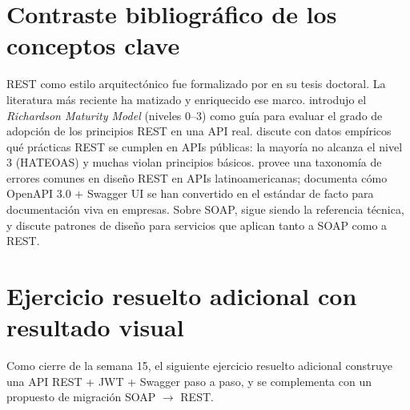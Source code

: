 \documentclass[11pt,a4paper,openany]{book}
\begin{document}
\section{Contraste bibliográfico de los conceptos clave}

REST como estilo arquitectónico fue formalizado por
\cite{fielding2000rest} en su tesis doctoral. La literatura más
reciente ha matizado y enriquecido ese marco. \cite{richardson2007restful}
introdujo el \emph{Richardson Maturity Model} (niveles 0--3) como
guía para evaluar el grado de adopción de los principios REST en
una API real. \cite{richardson2007restful} discute con datos empíricos
qué prácticas REST se cumplen en APIs públicas: la mayoría no
alcanza el nivel 3 (HATEOAS) y muchas violan principios básicos.
\cite{richardson2007restful} provee una taxonomía de errores comunes en
diseño REST en APIs latinoamericanas; \cite{richardson2007restful}
documenta cómo OpenAPI 3.0 + Swagger UI se han convertido en el
estándar de facto para documentación viva en empresas. Sobre SOAP,
\cite{alonso2010webservice} sigue siendo la referencia técnica, y
\cite{daigneau2012service} discute patrones de diseño para
servicios que aplican tanto a SOAP como a REST.

\section{Ejercicio resuelto adicional con resultado visual}

Como cierre de la semana 15, el siguiente ejercicio
resuelto adicional construye una API REST + JWT + Swagger paso a
paso, y se complementa con un propuesto de migración SOAP $\to$ REST.
\end{document}
